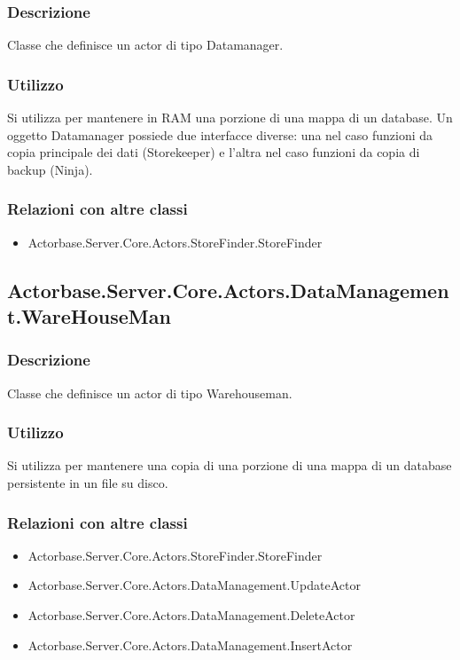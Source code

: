 \documentclass[a4paper]{article}
\begin{document}
			\subsubsection{Descrizione}
				Classe che definisce un actor di tipo Datamanager.
			\subsubsection{Utilizzo}
				Si utilizza per mantenere in RAM una porzione di una mappa di un database. Un oggetto Datamanager possiede due interfacce diverse: una nel caso funzioni da copia principale dei dati (Storekeeper) e l'altra nel caso funzioni da copia di backup (Ninja).
			\subsubsection{Relazioni con altre classi}
			\begin{itemize}
				\item Actorbase.Server.Core.Actors.StoreFinder.StoreFinder
			\end{itemize}
			
		\subsection{Actorbase.Server.Core.Actors.DataManagement.WareHouseMan}
			\subsubsection{Descrizione}
				Classe che definisce un actor di tipo Warehouseman.
			\subsubsection{Utilizzo}
				Si utilizza per mantenere una copia di una porzione di una mappa di un database persistente in un file su disco.
			\subsubsection{Relazioni con altre classi}
			\begin{itemize}
				\item Actorbase.Server.Core.Actors.StoreFinder.StoreFinder
				\item Actorbase.Server.Core.Actors.DataManagement.UpdateActor
				\item Actorbase.Server.Core.Actors.DataManagement.DeleteActor
				\item Actorbase.Server.Core.Actors.DataManagement.InsertActor
			\end{itemize}
			
\end{document}

